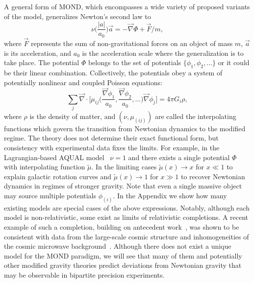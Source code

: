 \documentclass[aps,prl,reprint,superscriptaddress,nofootinbib,floatfix]{revtex4-2}
\begin{document}
A general form of MOND, which encompasses a wide variety of proposed variants of the model, generalizes Newton's second law to 
\begin{equation}
\nu\bigg(\frac{|a|}{a_{0}}\bigg)\vec{a} = -\vec{\nabla}\Phi + \vec{F}/m,
\label{eq:DiffMOND-1}
\end{equation}
where $\vec{F}$ represents the sum of non-gravitational forces on an object of mass $m$, $\vec a$ is its acceleration, and $a_0$ is the acceleration scale where the generalization is to take place. The potential $\Phi$ belongs to the set of potentials $\{ \phi_{1}, \phi_{2}, \dots \}$ or it could be their linear combination.
Collectively, the potentials obey a system of potentially nonlinear and coupled Poisson equations:
\begin{equation}
\sum_{j}\vec{\nabla}\cdot\bigg[\mu_{ij}\bigg(\frac{\vec{\nabla}\phi_{1}}{a_{0}}, \frac{\vec{\nabla}\phi_{2}}{a_{0}}, \dots \bigg)\vec{\nabla} \phi_{j}\bigg] = 4\pi G_{i} \rho,
    \label{eq:DiffMOND-2}
\end{equation}
where $\rho$ is the density of matter, and 
$(\nu,\mu_{(ij)})$ are called the interpolating functions which govern the transition from Newtonian dynamics to the modified regime. 
The theory does not determine their exact functional form, but consistency with experimental data fixes the limits. For example, in the Lagrangian-based AQUAL model~\cite{Lag4MOND-Bekenstein1984} $\nu=1$ and there exists a single potential $\Phi$ with interpolating function $\tilde{\mu}$. In the limiting cases 
$\tilde \mu(x) \to x$ for $x\ll 1$ to explain galactic rotation curves and $ \tilde \mu(x) \to 1$ for $x\gg 1$ to recover Newtonian dynamics in regimes of stronger gravity.
Note that even a single massive object may source multiple potentials $\phi_{(i)}$.
In the Appendix we show how many existing models are special cases of the above expressions.
Notably, although each model is non-relativistic, some exist as limits of relativistic completions. 
A recent example of such a completion, building on antecedent work~\cite{TeVeS-Bekenstein2004}, was shown to be consistent with data from the large-scale cosmic structure and inhomogeneities of the cosmic microwave background~\cite{RMOND-Zlosnik2021}.
Although there does not exist a unique model for the MOND paradigm, we will see that many of them and potentially other modified gravity theories predict deviations from Newtonian gravity that may be observable in bipartite precision experiments.
\end{document}
